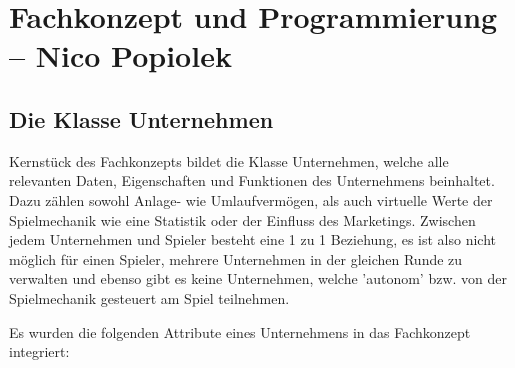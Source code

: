 \chapter{Fachkonzept und Programmierung -- Nico Popiolek}

\section{Die Klasse Unternehmen}
Kernstück des Fachkonzepts bildet die Klasse Unternehmen, welche alle relevanten Daten, Eigenschaften und Funktionen des Unternehmens beinhaltet. Dazu zählen sowohl Anlage- wie Umlaufvermögen, als auch virtuelle Werte der Spielmechanik wie eine Statistik oder der Einfluss des Marketings. Zwischen jedem Unternehmen und Spieler besteht eine 1 zu 1 Beziehung, es ist also nicht möglich für einen Spieler, mehrere Unternehmen in der gleichen Runde zu verwalten und ebenso gibt es keine Unternehmen, welche 'autonom' bzw. von der Spielmechanik gesteuert am Spiel teilnehmen.

Es wurden die folgenden Attribute eines Unternehmens in das Fachkonzept integriert:

